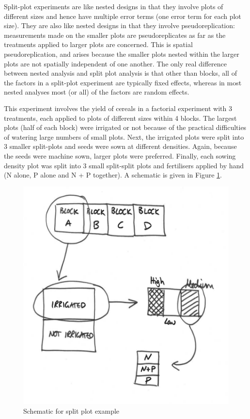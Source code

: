 \documentclass[]{book}
\theoremstyle{definition}
\theoremstyle{definition}
\theoremstyle{definition}
\theoremstyle{remark}
\begin{document}
Split-plot experiments are like nested designs in that they involve
plots of different sizes and hence have multiple error terms (one error
term for each plot size). They are also like nested designs in that they
involve pseudoreplication: measurements made on the smaller plots are
pseudoreplicates as far as the treatments applied to larger plots are
concerned. This is spatial pseudoreplication, and arises because the
smaller plots nested within the larger plots are not spatially
independent of one another. The only real difference between nested
analysis and split plot analysis is that other than blocks, all of the
factors in a split-plot experiment are typically fixed effects, whereas
in most nested analyses most (or all) of the factors are random effects.

This experiment involves the yield of cereals in a factorial experiment
with 3 treatments, each applied to plots of different sizes within 4
blocks. The largest plots (half of each block) were irrigated or not
because of the practical difficulties of watering large numbers of small
plots. Next, the irrigated plots were split into 3 smaller split-plots
and seeds were sown at different densities. Again, because the seeds
were machine sown, larger plots were preferred. Finally, each sowing
density plot was split into 3 small split-split plots and fertilisers
applied by hand (N alone, P alone and N + P together). A schematic is
given in Figure \ref{fig:splityields}.

\begin{figure}

{\centering \includegraphics[width=0.8\linewidth,height=0.8\textheight]{_img/splitPlot} 

}

\caption{Schematic for split plot example}\label{fig:splityields}
\end{figure}
\end{document}
